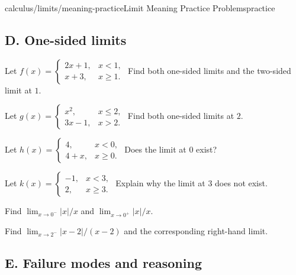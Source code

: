 \documentclass[11pt,openany]{book}
\theoremstyle{bgplain}
\begin{document}
\begin{webpage}{calculus/limits/meaning-practice}{Limit Meaning Practice Problems}{practice}
\subsection*{D. One-sided limits}

\begin{bgexercises}[label=\textbf{1.\arabic*},resume]
  \item Let \(f(x)=\begin{cases}2x+1,&x<1,\\x+3,&x\ge1.\end{cases}\) Find both one-sided limits and the two-sided limit at \(1\).
  \item Let \(g(x)=\begin{cases}x^2,&x\le2,\\3x-1,&x>2.\end{cases}\) Find both one-sided limits at \(2\).
  \item Let \(h(x)=\begin{cases}4,&x<0,\\4+x,&x\ge0.\end{cases}\) Does the limit at \(0\) exist?
  \item Let \(k(x)=\begin{cases}-1,&x<3,\\2,&x\ge3.\end{cases}\) Explain why the limit at \(3\) does not exist.
  \item Find \(\lim_{x\to0^-}|x|/x\) and \(\lim_{x\to0^+}|x|/x\).
  \item Find \(\lim_{x\to2^-}|x-2|/(x-2)\) and the corresponding right-hand limit.
\end{bgexercises}

\subsection*{E. Failure modes and reasoning}


\end{webpage}
\end{document}

